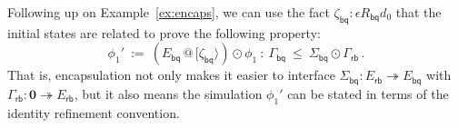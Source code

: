 \documentclass[acmsmall,screen,review,anonymous,nonacm]{acmart}
\newcommand{\kw}[1]{\ensuremath{ \mathsf{#1} }}
\newcommand{\vcomp}{\fatsemi}
\newcommand{\sepconj}{\oast}
\newcommand{\emptysig}{\mathbf0}
\begin{document}

\begin{example} %
Following up on Example~\ref{ex:encaps},
we can use the fact $\zeta_\kw{bq} : \epsilon \mathbin{R_\kw{bq}} d_0$
that the initial states are related
to prove the following property:
\[
  \phi_1' \: := \:
  (E_\kw{bq} \mathbin@ [\zeta_\kw{bq}\rangle) \odot \phi_1
  \: : \:
  \Gamma_\kw{bq} \: \le \: \Sigma_\kw{bq} \odot \Gamma_\kw{rb}
  \,.
\]
That is, encapsulation not only makes it easier
to interface $\Sigma_\kw{bq} : E_\kw{rb} \twoheadrightarrow E_\kw{bq}$
with $\Gamma_\kw{rb} : \emptysig \twoheadrightarrow E_\kw{rb}$,
but it also means the simulation
$\phi_1'$ can be stated in terms of the identity refinement convention.


\end{example}
\end{document}
